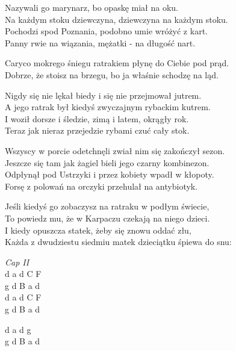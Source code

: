 \begin{textn}

    Nazywali go marynarz, bo opaskę miał na oku.\\
    Na każdym stoku dziewczyna, dziewczyna na każdym stoku.\\
    Pochodzi spod Poznania, podobno umie wróżyć z kart.\\
    Panny rwie na wiązania, mężatki - na długość nart.

    Caryco mokrego śniegu ratrakiem płynę do Ciebie pod prąd.\\
    Dobrze, że stoisz na brzegu, bo ja właśnie schodzę na ląd.

    Nigdy się nie lękał biedy i się nie przejmował jutrem.\\
    A jego ratrak był kiedyś zwyczajnym rybackim kutrem.\\
    I woził dorsze i śledzie, zimą i latem, okrągły rok.\\
    Teraz jak nieraz przejedzie rybami czuć cały stok.

    Wszyscy w porcie odetchnęli zwiał nim się zakończył sezon.\\
    Jeszcze się tam jak żagiel bieli jego czarny kombinezon.\\
    Odpłynął pod Ustrzyki i przez kobiety wpadł w kłopoty.\\
    Forsę z polowań na orczyki przehulał na antybiotyk.

    Jeśli kiedyś go zobaczysz na ratraku w podłym świecie,\\
    To powiedz mu, że w Karpaczu czekają na niego dzieci.\\
    I kiedy opuszcza statek, żeby się znowu oddać złu,\\
    Każda z dwudziestu siedmiu matek dzieciątku śpiewa do snu:

\end{textn}
\begin{chord}
    \ifOneCol \else \footnotesize{ \fi
    \textit{Cap II}\\
    d a d C F\\
    g d B a d\\
    d a d C F\\
    g d B a d

    d a d g\\
    g d B a d
    \ifOneCol \else } \fi
\end{chord}
